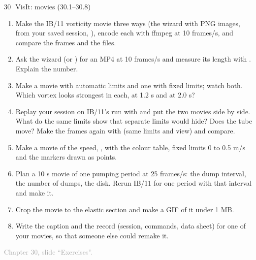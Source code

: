 \documentclass[aspectratio=169,11pt]{beamer}
\newcommand{\sourcecredit}[1]{\vfill\begin{flushright}\tiny\textcolor{DarkGray}{#1}\end{flushright}}
\begin{document}
\begin{frame}{30\,\textbullet\ VisIt: movies (30.1--30.8)}
\label{fr:c30x1}
\footnotesize
\begin{enumerate}\setlength{\itemsep}{1pt}
  \item[30.1] Make the IB/11 vorticity movie three ways (the wizard with PNG images,  from your saved session, ), encode each with ffmpeg at 10 frames/s, and compare the frames and the files.
  \item[30.2] Ask the wizard (or ) for an MP4 at 10 frames/s and measure its length with . Explain the number.
  \item[30.3] Make a movie with automatic limits and one with fixed limits; watch both. Which vortex looks strongest in each, at 1.2 s and at 2.0 s?
  \item[30.4] Replay your session on IB/11's  run with  and put the two movies side by side. What do the same limits show that separate limits would hide? Does the tube move? Make the  frames again with  (same limits and view) and compare.
  \item[30.5] Make a movie of the speed, , with the  colour table, fixed limits 0 to 0.5 m/s and the markers drawn as points.
  \item[30.6] Plan a 10 s movie of one pumping period at 25 frames/s: the dump interval, the number of dumps, the disk. Rerun IB/11 for one period with that interval and make it.
  \item[30.7] Crop the movie to the elastic section and make a GIF of it under 1 MB.
  \item[30.8] Write the caption and the record (session, commands, data sheet) for one of your movies, so that someone else could remake it.
\end{enumerate}
\sourcecredit{Chapter 30, slide ``Exercises''.}
\end{frame}
\end{document}
